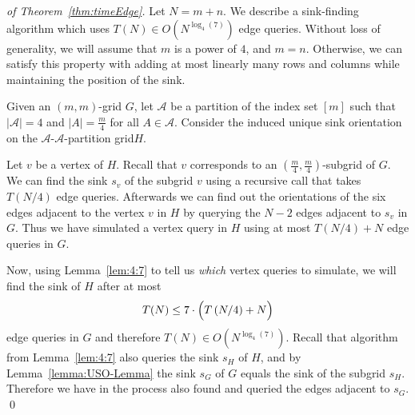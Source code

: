 \documentclass[runningheads,a4paper]{llncs}
\newcommand{\A}{\ensuremath{\mathcal A}}
\newcommand{\sink}{\ensuremath{\mathrm{sink}}}
\newcommand{\aapart}{$\A$-$\A$-partition grid\xspace}
\begin{document}
\begin{proof}[of Theorem~\ref{thm:timeEdge}]
    Let $N = m+n$.
    We describe a sink-finding algorithm which uses
    $T(N) \in O(N ^ {\log_4(7)})$ edge queries.
    Without loss of generality, we will assume that $m$ is a power of $4$, and
    $m=n$. Otherwise, we can satisfy this property with adding at most linearly many rows and columns while maintaining the position of the sink.

    Given an $(m,m)$-grid $G$, let $\A$
    be a partition of the index set $[m]$ such that
    $|\A| = 4$ and $|A| = \frac{m}{4}$ for all $A \in \A$.
    Consider the induced unique sink orientation on the \aapart $H$.
    
    
    Let $v$ be a vertex of $H$. Recall that $v$ corresponds to an $(\frac{m}{4},\frac{m}{4})$-subgrid of $G$.
    We can find the sink $s_v$ of the subgrid $v$ using a recursive call that takes $T(N/4)$ edge queries.
    Afterwards we can find out the orientations of the six edges
    adjacent to the vertex $v$ in $H$ by querying the $N-2$ edges adjacent to $s_v$ in $G$.
    Thus we have simulated a vertex query in $H$ using at most $T(N/4) + N$ edge queries in $G$.

    Now, using Lemma~\ref{lem:4:7} to tell us \emph{which} vertex
    queries to simulate, we will find the sink of $H$
    after at most
    \[
        T(N) \le 7 \cdot \Bigl( T \left( N/4 \right) + N \Bigr)
    \]
    edge queries in $G$ and therefore $T(N) \in O(N ^ {\log_4(7)})$. 
    Recall that algorithm from Lemma~\ref{lem:4:7} also queries the sink $s_H$ of $H$, and by Lemma~\ref{lemma:USO-Lemma} the sink $s_G$ of $G$ equals the sink of the subgrid $s_H$. Therefore we have in the process also found and queried the edges adjacent to $s_G$.
    \qed
\end{proof}



\end{document}
